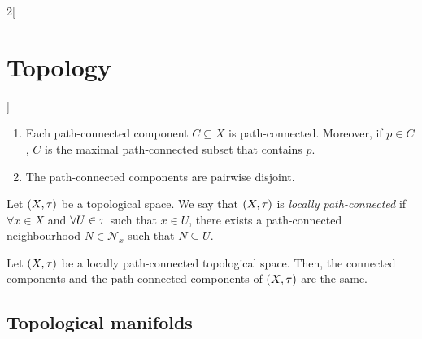 \documentclass[../../../main.tex]{subfiles}
\begin{document}
\begin{multicols}{2}[\section{Topology}]
\begin{prop}
\begin{enumerate}
      \item Each path-connected component $C\subseteq X$ is path-connected. Moreover, if $p\in C$, $C$ is the maximal path-connected subset that contains $p$.
      \item The path-connected components are pairwise disjoint.
    \end{enumerate}
  \end{prop}
  \begin{definition}
    Let $(X,\tau)$ be a topological space. We say that $(X,\tau)$ is \emph{locally path-connected} if $\forall x\in X$ and $\forall U\in\tau$ such that $x\in U$, there exists a path-connected neighbourhood $N\in\mathcal{N}_x$ such that $N\subseteq U$.
  \end{definition}
  \begin{theorem}
    Let $(X,\tau)$ be a locally path-connected topological space. Then, the connected components and the path-connected components of $(X,\tau)$ are the same.
  \end{theorem}
  \subsection{Topological manifolds}

\end{multicols}
\end{document}

